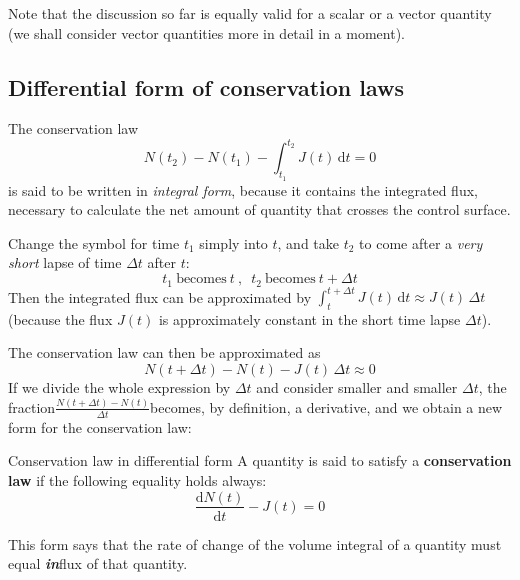 \documentclass[a4paper,12pt,%
onecolumn,oneside,titlepage,%
british%
]{memoir}
\newcommand{\mynotew}[1]{{\footnotesize\color{midgrey}\faIcon{tools}\ #1}}
\newcommand*{\di}{\mathrm{d}}%
\newcommand*{\incr}{\Delta}%
\renewcommand*{\|}[1][]{\nonscript\:#1\vert\nonscript\:\mathopen{}}
\newcommand*{\yN}{N}
\newcommand*{\yJ}{J}
\newcommand*{\Dt}{\incr t}
\begin{document}

\smallskip

Note that the discussion so far is equally valid for a scalar or a vector quantity (we shall consider vector quantities more in detail in a moment).




\subsection{Differential form of conservation laws}
\label{sec:conservation_laws_diff}

The conservation law
\begin{equation*}
  \yN(t_{2}) - \yN(t_{1}) - \int_{t_{1}}^{t_{2}}\!\!\yJ(t)\, \di t = 0
\end{equation*}
is said to be written in \emph{integral form}, because it contains the integrated flux, necessary to calculate the net amount of quantity that crosses the control surface.

Change the symbol for time $t_{1}$ simply into $t$, and take $t_{2}$ to come after a \emph{very short} lapse of time $\Dt$ after $t$:
\begin{equation*}
  t_{1}\ \text{becomes}\ t\ ,\enspace t_{2}\ \text{becomes}\ t+\Dt
\end{equation*}
Then the integrated flux can be approximated by $\int_{t}^{t+\Dt}\!\!\yJ(t)\, \di t \approx \yJ(t)\, \Dt$ (because the flux $\yJ(t)$ is approximately constant in the short time lapse $\Dt$).

%
The conservation law can then be approximated as
\begin{equation*}
  \yN(t+\Dt) - \yN(t) - \yJ(t)\, \Dt \approx 0
\end{equation*}
If we divide the whole expression by $\Dt$ and consider smaller and smaller $\Dt$, the fraction\enspace$\frac{\yN(t+\Dt)-\yN(t)}{\Dt}$\enspace becomes, by definition, a derivative, and we obtain a new form for the conservation law:
\begin{definition}{Conservation law in differential form}
  A quantity is said to satisfy a \textbf{conservation law} if the following equality holds always:
  \begin{equation}
    \label{eq:conserved_diff}
    \frac{\di\yN(t)}{\di t}- \yJ(t) = 0
  \end{equation}
\end{definition}
This form says that the rate of change of the volume integral of a quantity must equal \emph{\textbf{in}}flux of that quantity.
\end{document}
